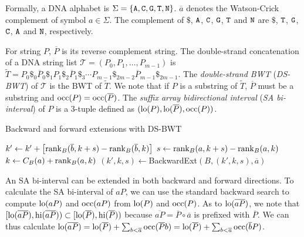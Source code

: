 \documentclass[webpdf,contemporary,large,namedate]{oup-authoring-template}%
\begin{document}
Formally, a DNA alphabet is $\Sigma=\{{\tt A},{\tt C},{\tt G},{\tt T},{\tt N}\}$.
$\overline{a}$ denotes the Watson-Crick complement of symbol $a\in\Sigma$.
The complement of $\$$, ${\tt A}$, ${\tt C}$, ${\tt G}$, ${\tt T}$ and ${\tt N}$
are $\$$, ${\tt T}$, ${\tt G}$, ${\tt C}$, ${\tt A}$ and ${\tt N}$, respectively.

For string $P$, $\overline{P}$ is its reverse complement string.
The double-strand concatenation of a DNA string list $\mathcal{T}=(P_0,P_1,\ldots,P_{m-1})$ is
$\tilde{T}=P_0\$_0\overline{P}_0\$_1P_1\$_2\overline{P}_1\$_3\cdots P_{m-1}\$_{2m-2}\overline{P}_{m-1}\$_{2m-1}$.
The \emph{double-strand BWT} (\emph{DS-BWT}) of $\mathcal{T}$ is the BWT of $\tilde{T}$.
We note that if $P$ is a substring of $\tilde{T}$,
$\overline{P}$ must be a substring and ${\rm occ}(P)={\rm occ}(\overline{P})$.
The \emph{suffix array bidirectional interval} (\emph{SA bi-interval}) of $P$ is a 3-tuple defined as $({\rm lo}(P),{\rm lo}(\overline{P}),{\rm occ}(P))$.

\begin{algorithm}[tb]
	\caption{Backward and forward extensions with DS-BWT}\label{algo:backfor}
	\begin{algorithmic}[1]
				\State $k'\gets k'+\big[{\rm rank}_B(\overline{b},k+s)-{\rm rank}_B(\overline{b},k)\big]$
			\EndFor
			\State $s\gets {\rm rank}_B(a,k+s)-{\rm rank}_B(a,k)$
			\State $k\gets C_B(a)+{\rm rank}_B(a,k)$
			\State {}
		\EndProcedure
			\State $(k',k,s)\gets${\sc BackwardExt}$(B,(k',k,s),\overline{a})$
			\State {}
		\EndProcedure
	\end{algorithmic}
\end{algorithm}

An SA bi-interval can be extended in both backward and forward directions.
To calculate the SA bi-interval of $aP$, we can use the standard backward search to compute ${\rm lo}(aP)$ and ${\rm occ}(aP)$ from ${\rm lo}(P)$ and ${\rm occ}(P)$.
As to ${\rm lo}(\overline{aP})$, we note that $[{\rm lo}(\overline{aP}),{\rm hi}(\overline{aP}))\subset[{\rm lo}(\overline{P}),{\rm hi}(\overline{P}))$
because $\overline{aP}=\overline{P}\circ\overline{a}$ is prefixed with $\overline{P}$.
We can thus calculate ${\rm lo}(\overline{aP})={\rm lo}(\overline{P})+\sum_{b<\overline{a}}{\rm occ}(\overline{P}b)={\rm lo}(\overline{P})+\sum_{b<\overline{a}}{\rm occ}(\overline{b}P)$.
\end{document}
